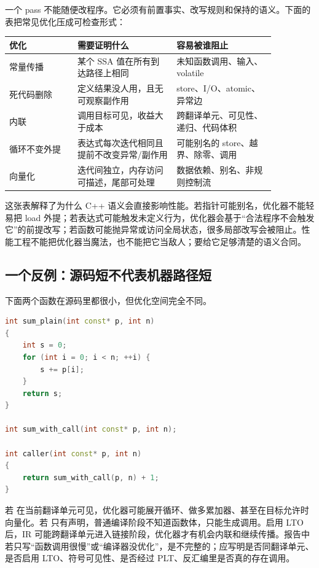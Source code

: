 一个 pass 不能随便改程序。它必须有前置事实、改写规则和保持的语义。下面的表把常见优化压成可检查形式：

\begin{center}
\begin{tabular}{p{0.22\linewidth}p{0.32\linewidth}p{0.32\linewidth}}
\toprule
优化 & 需要证明什么 & 容易被谁阻止 \\
\midrule
常量传播 & 某个 SSA 值在所有到达路径上相同 & 未知函数调用、输入、volatile \\
死代码删除 & 定义结果没人用，且无可观察副作用 & store、I/O、atomic、异常边 \\
内联 & 调用目标可见，收益大于成本 & 跨翻译单元、可见性、递归、代码体积 \\
循环不变外提 & 表达式每次迭代相同且提前不改变异常/副作用 & 可能别名的 store、越界、除零、调用 \\
向量化 & 迭代间独立，内存访问可描述，尾部可处理 & 数据依赖、别名、非规则控制流 \\
\bottomrule
\end{tabular}
\end{center}

这张表解释了为什么 C++ 语义会直接影响性能。若指针可能别名，优化器不能轻易把 load 外提；若表达式可能触发未定义行为，优化器会基于“合法程序不会触发它”的前提改写；若函数可能抛异常或访问全局状态，很多局部改写会被阻止。性能工程不能把优化器当魔法，也不能把它当敌人；要给它足够清楚的语义合同。

\subsection{一个反例：源码短不代表机器路径短}

下面两个函数在源码里都很小，但优化空间完全不同。

\begin{lstlisting}[language=C++,caption={两个看似相近的求和接口}]
int sum_plain(int const* p, int n)
{
    int s = 0;
    for (int i = 0; i < n; ++i) {
        s += p[i];
    }
    return s;
}

int sum_with_call(int const* p, int n);

int caller(int const* p, int n)
{
    return sum_with_call(p, n) + 1;
}
\end{lstlisting}

若  在当前翻译单元可见，优化器可能展开循环、做多累加器、甚至在目标允许时向量化。若  只有声明，普通编译阶段不知道函数体，只能生成调用。启用 LTO 后，IR 可能跨翻译单元进入链接阶段，优化器才有机会内联和继续传播。报告中若只写“函数调用很慢”或“编译器没优化”，是不完整的；应写明是否同翻译单元、是否启用 LTO、符号可见性、是否经过 PLT、反汇编里是否真的存在调用。

